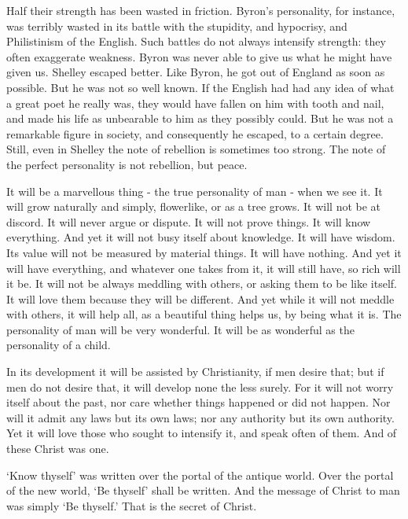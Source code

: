 Half their strength has been wasted in friction. Byron’s personality, for instance, was terribly wasted in its battle with the stupidity, and hypocrisy, and Philistinism of the English. Such battles do not always intensify strength: they often exaggerate weakness. Byron was never able to give us what he might have given us. Shelley escaped better. Like Byron, he got out of England as soon as possible. But he was not so well known. If the English had had any idea of what a great poet he really was, they would have fallen on him with tooth and nail, and made his life as unbearable to him as they possibly could. But he was not a remarkable figure in society, and consequently he escaped, to a certain degree. Still, even in Shelley the note of rebellion is sometimes too strong. The note of the perfect personality is not rebellion, but peace.\par

It will be a marvellous thing - the true personality of man - when we see it. It will grow naturally and simply, flowerlike, or as a tree grows. It will not be at discord. It will never argue or dispute. It will not prove things. It will know everything. And yet it will not busy itself about knowledge. It will have wisdom. Its value will not be measured by material things. It will have nothing. And yet it will have everything, and whatever one takes from it, it will still have, so rich will it be. It will not be always meddling with others, or asking them to be like itself. It will love them because they will be different. And yet while it will not meddle with others, it will help all, as a beautiful thing helps us, by being what it is. The personality of man will be very wonderful. It will be as wonderful as the personality of a child.\par

In its development it will be assisted by Christianity, if men desire that; but if men do not desire that, it will develop none the less surely. For it will not worry itself about the past, nor care whether things happened or did not happen. Nor will it admit any laws but its own laws; nor any authority but its own authority. Yet it will love those who sought to intensify it, and speak often of them. And of these Christ was one.\par

‘Know thyself’ was written over the portal of the antique world. Over the portal of the new world, ‘Be thyself’ shall be written. And the message of Christ to man was simply ‘Be thyself.’ That is the secret of Christ.\par

